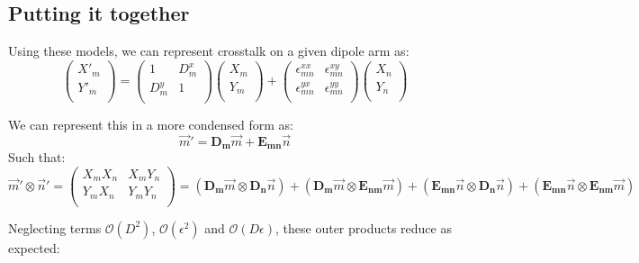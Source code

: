 \documentclass[10pt,a4paper,notitlepage]{article}
\begin{document}
\subsection{Putting it together}
\label{subsec:theory_both}
Using these models, we can represent crosstalk on a given dipole arm as:
\begin{equation}
\begin{pmatrix}
X'_m\\
Y'_m\\
\end{pmatrix}
=
\begin{pmatrix}
1 & D^x_m \\
D^y_m & 1 \\
\end{pmatrix}
\begin{pmatrix}
X_m\\
Y_m\\
\end{pmatrix}
+
\begin{pmatrix}
\epsilon^{xx}_{mn} &\epsilon^{xy}_{mn} \\
\epsilon^{yx}_{mn} &\epsilon^{yy}_{mn} \\
\end{pmatrix}
\begin{pmatrix}
X_n\\
Y_n\\
\end{pmatrix}
\end{equation} 

\noindent We can represent this in a more condensed form as:
\begin{equation}
\vec{m}' = \boldsymbol{D_m}\vec{m} + \boldsymbol{E_{mn}}\vec{n}
\end{equation}
\noindent Such that:
\begin{equation}
\vec{m}'\otimes\vec{n}'
=
\begin{pmatrix}
X_mX_n & X_mY_n \\
Y_mX_n & Y_mY_n\\
\end{pmatrix}
=
(\boldsymbol{D_m}\vec{m} \otimes \boldsymbol{D_n}\vec{n})
+
(\boldsymbol{D_m}\vec{m} \otimes \boldsymbol{E_{nm}}\vec{m})
+
(\boldsymbol{E_{mn}}\vec{n} \otimes \boldsymbol{D_n}\vec{n})
+
(\boldsymbol{E_{mn}}\vec{n} \otimes \boldsymbol{E_{nm}}\vec{m})
\end{equation}

\noindent Neglecting terms $\mathcal{O}(D^2)$, $\mathcal{O}(\epsilon^2)$ and $\mathcal{O}(D\epsilon)$, these outer products reduce as expected:
\end{document}
